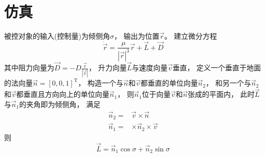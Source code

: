 \section{仿真}
被控对象的输入(控制量)为倾侧角$\sigma$，
输出为位置$\vec{r}$。
建立微分方程
\[\ddot{\vec{r}} = \frac{\mu}{|\vec{r}|^3}\vec{r}+\vec{L}+\vec{D}\]
其中阻力向量为$\vec{D} = -D\frac{\vec{v}}{|\vec{v}|}$，
升力向量$\vec{L}$与速度向量$\vec{v}$垂直，
定义一个垂直于地面的法向量$\vec{n}=[0,0,1]^\text{T}$，
构造一个与$\vec{n}$和$\vec{v}$都垂直的单位向量$\vec{n}_2$，
和另一个与$\vec{n}_2$和$\vec{v}$都垂直且方向向上的单位向量$\vec{n}_1$，
则$\vec{n}_1$位于向量$\vec{v}$和$\vec{n}$张成的平面内，
此时$\vec{L}$与$\vec{n}_1$的夹角即为倾侧角，
满足
\begin{align*}
    \vec{n}_2 =& \vec{v}\times\vec{n} \\
    \vec{n}_1 =& \times\vec{n}_2\times\vec{v}
\end{align*}
则
\[\vec{L}=\vec{n}_1\cos\sigma + \vec{n}_2\sin\sigma\]
